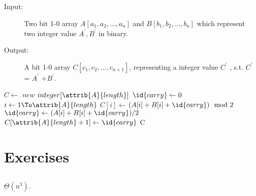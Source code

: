 \documentclass[paper=a4, fontsize=11pt,oneside]{book} %
\numberwithin{equation}{section} %
\numberwithin{figure}{section} %
\numberwithin{table}{section} %
\begin{document}
		 \subsection{}
		 \begin{description}
		 	\item[Input:] Two bit 1-0 array $A[a_1, a_2, ... , a_n]$ and $B[b_1, b_2, ..., b_n]$ which represent two integer value $A^{'}, B^{'}$ in binary.
		 	\item[Output:] A bit 1-0 array $C[c_1, c_2, ..., c_{n+1}]$, representing a integer value $C^{'}$
		 	, s.t. $C^{'} $= $A^{'}$ $+ B^{'}$.
		 \end{description}
		 \begin{codebox}
		 	\li $C \gets$ $new$ $integer[\attrib{A}{length}]$
		 	\li $\id{carry} \gets 0$
		 	\li \For $i \gets 1 \To \attrib{A}{length}$
		 	\li \Do 
					  $C[i] \gets$$ (A[i] + B[i] + \id{carry})\mod{2}$
			\li 	  $\id{carry} \gets (A[i] + B[i] + \id{carry}) / 2$
				\End
			\li $C[\attrib{A}{length}+1] \gets \id{carry}$
			\li \Return C
			    \End
					 
		 	\end{codebox}
		 	
	\section{Exercises}
		\subsection{}
			$\Theta(n^3)$.
\end{document}
